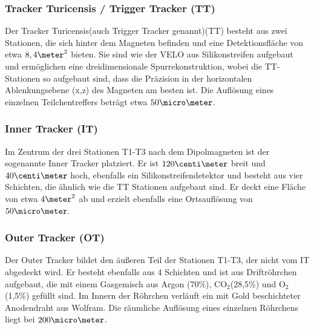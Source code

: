 \subsubsection{Tracker Turicensis / Trigger Tracker (TT)}
Der Tracker Turicensis(auch Trigger Tracker genannt)(TT) besteht aus zwei Stationen, die sich hinter dem Magneten befinden und eine Detektionsfläche von etwa $8,4\meter^2$ bieten. Sie sind wie der VELO aus Silikonstreifen aufgebaut und ermöglichen eine dreidimensionale Spurrekonstruktion, wobei die TT-Stationen so aufgebaut sind, dass die Präzision in der horizontalen Ablenkungsebene (x,z) des Magneten am besten ist. Die Auflösung eines einzelnen Teilchentreffers beträgt etwa $50\micro\meter$.

\subsubsection{Inner Tracker (IT)}
Im Zentrum der drei Stationen T1-T3 nach dem Dipolmagneten ist der sogenannte Inner Tracker platziert. Er ist $120\centi\meter$ breit und $40\centi\meter$ hoch, ebenfalls ein Silikonstreifendetektor und besteht aus vier Schichten, die ähnlich wie die TT Stationen aufgebaut sind. Er deckt eine Fläche von etwa $4\meter^2$ ab und erzielt ebenfalls eine Ortsauflösung von $50\micro\meter$.

\subsubsection{Outer Tracker (OT)}
Der Outer Tracker bildet den äußeren Teil der Stationen T1-T3, der nicht vom IT abgedeckt wird. Er besteht ebenfalls aus 4 Schichten und ist aus Driftröhrchen aufgebaut, die mit einem Gasgemisch aus Argon (70\%), CO$_2$(28,5\%) und O$_2$ (1,5\%) gefüllt sind. Im Innern der Röhrchen verläuft ein mit Gold beschichteter Anodendraht aus Wolfram. Die räumliche Auflösung eines einzelnen Röhrchens liegt bei $200\micro\meter$.

